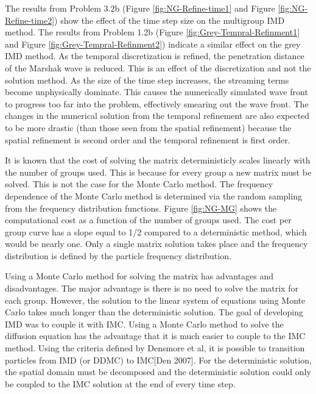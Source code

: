 	The results from Problem 3.2b (Figure \ref{fig:NG-Refine-time1} and Figure \ref{fig:NG-Refine-time2}) show the effect of the time step size on the multigroup IMD method. The results from Problem 1.2b (Figure \ref{fig:Grey-Tempral-Refinment1} and Figure \ref{fig:Grey-Tempral-Refinment2}) indicate a similar effect on the grey IMD method. As the temporal discretization is refined, the penetration distance of the Marshak wave is reduced. This is an effect of the discretization and not the solution method. As the size of the time step increases, the streaming terms become unphysically dominate. This causes the numerically simulated wave front to progress too far into the problem, effectively smearing out the wave front. The changes in the numerical solution from the temporal refinement are also expected to be more drastic (than those seen from the spatial refinement) because the spatial refinement is second order and the temporal refinement is first order.

	It is known that the cost of solving the matrix deterministicly scales linearly with the number of groups used. This is because for every group a new matrix must be solved. This is not the case for the Monte Carlo method. The frequency dependence of the Monte Carlo method is determined via the random sampling from the frequency distribution functions. Figure \ref{fig:NG-MG} shows the computational cost as a function of the number of groups used. The cost per group curve has a slope equal to 1/2 compared to a deterministic method, which would be nearly one. Only a single matrix solution takes place and the frequency distribution is defined by the particle frequency distribution.  
	
	Using a Monte Carlo method for solving the matrix has advantages and disadvantages. The major advantage is there is no need to solve the matrix for each group. However, the solution to the linear system of equations using Monte Carlo takes much longer than the deterministic solution. The goal of developing IMD was to couple it with IMC. Using a Monte Carlo method to solve the diffusion equation has the advantage that it is much easier to couple to the IMC method. Using the criteria defined by Densmore et al, it is possible to transition particles from IMD (or DDMC) to IMC[Den 2007]. For the deterministic solution, the spatial domain must be decomposed and the deterministic solution could only be coupled to the IMC solution at the end of every time step.

	

	

